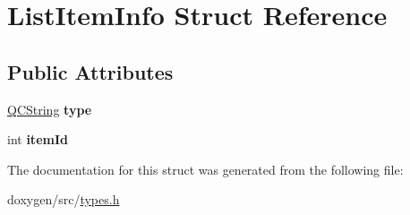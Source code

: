 \hypertarget{struct_list_item_info}{}\section{List\+Item\+Info Struct Reference}
\label{struct_list_item_info}
\subsection*{Public Attributes}
\begin{DoxyCompactItemize}
\item 
\mbox{\label{struct_list_item_info_a06163c0e861ec13f8b8d24823d04b1f9}} 
\mbox{\hyperlink{class_q_c_string}{Q\+C\+String}} {\bfseries type}
\item 
\mbox{\label{struct_list_item_info_a98dbe1449912070056112940c1ff0208}} 
int {\bfseries item\+Id}
\end{DoxyCompactItemize}


The documentation for this struct was generated from the following file\+:\begin{DoxyCompactItemize}
\item 
doxygen/src/\mbox{\hyperlink{types_8h}{types.\+h}}\end{DoxyCompactItemize}
